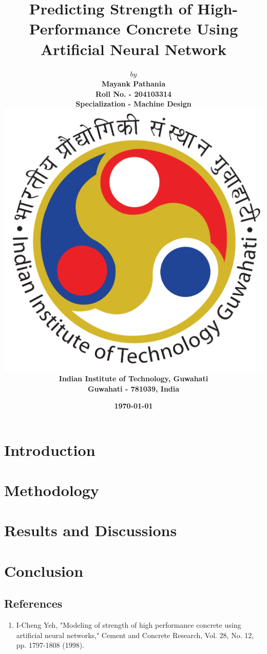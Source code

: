 \documentclass[12pt]{report}
\title{
    {\textbf{Predicting Strength of High-Performance Concrete Using Artificial Neural Network}}\\
}
\author{$by$\\
	\textbf{Mayank Pathania}\\
	\textbf{Roll No. - 204103314}\\
	\vspace{1in}
	\textbf{Specialization - Machine Design}\\
	{\includegraphics[scale=0.2]{images/university.png}}\\
	{\large \textbf{Indian Institute of Technology, Guwahati}}\\
	{\large \textbf{Guwahati - 781039, India}}
}
\date{\textbf{\today}}
\begin{document}
\maketitle
\tableofcontents

\setcounter{chapter}{1} 
\setcounter{section}{0}
\setcounter{figure}{0}
\setcounter{table}{0}
\chapter*{Introduction}


\setcounter{chapter}{2}
\setcounter{section}{0}
\setcounter{figure}{0}
\setcounter{table}{0}
\chapter*{Methodology}


\setcounter{chapter}{3}
\setcounter{section}{0}
\setcounter{figure}{0}
\setcounter{table}{0}
\chapter*{Results and Discussions}


\setcounter{chapter}{4}
\setcounter{section}{0}
\setcounter{figure}{0}
\setcounter{table}{0}
\chapter*{Conclusion}


\section*{References}
\begin{enumerate}
	\item I-Cheng Yeh, "Modeling of strength of high performance concrete using artificial neural networks," Cement and Concrete Research, Vol. 28, No. 12, pp. 1797-1808 (1998).
\end{enumerate}
\end{document}
